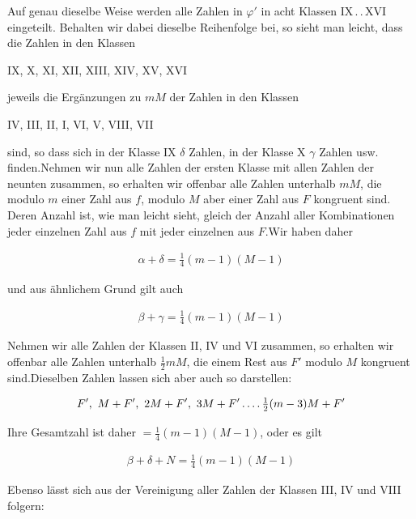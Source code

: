 Auf genau dieselbe Weise werden alle Zahlen in $\varphi'$ in acht Klassen IX\,.\,.\,XVI eingeteilt. Behalten wir dabei dieselbe Reihenfolge bei, so sieht man leicht, dass die Zahlen in den Klassen

\begin{center}IX, X, XI, XII, XIII, XIV, XV, XVI\end{center}

jeweils die Ergänzungen zu $mM$ der Zahlen in den Klassen

\begin{center}IV, III, II, I, VI, V, VIII, VII\end{center}

sind, so dass sich in der Klasse IX $\delta$ Zahlen, in der Klasse X $\gamma$ Zahlen usw. finden.\quad Nehmen wir nun alle Zahlen der ersten Klasse mit allen Zahlen der neunten zusammen, so erhalten wir offenbar alle Zahlen unterhalb $mM$, die modulo $m$ einer Zahl aus $f$, modulo $M$ aber einer Zahl aus $F$ kongruent sind. Deren Anzahl ist, wie man leicht sieht, gleich der Anzahl aller Kombinationen jeder einzelnen Zahl aus $f$ mit jeder einzelnen aus $F$.\quad Wir haben daher

\[
\begin{aligned}
\alpha+\delta=\tfrac14(m-1)(M-1)
\end{aligned}
\]

und aus ähnlichem Grund gilt auch

\[
\begin{aligned}
\beta+\gamma=\tfrac14(m-1)(M-1)
\end{aligned}
\]

Nehmen wir alle Zahlen der Klassen II, IV und VI zusammen, so erhalten wir offenbar alle Zahlen unterhalb $\frac12mM$, die einem Rest aus $F'$ modulo $M$ kongruent sind.\quad Dieselben Zahlen lassen sich aber auch so darstellen:

\[
\begin{aligned}
F',\ M+F',\ 2M+F',\ 3M+F'\mathinner{.\,.\,.\,.}\tfrac12(m-3)M+F'
\end{aligned}
\]

Ihre Gesamtzahl ist daher $=\frac14(m-1)(M-1)$, oder es gilt

\[
\begin{aligned}
\beta+\delta+N=\tfrac14(m-1)(M-1)
\end{aligned}
\]

Ebenso lässt sich aus der Vereinigung aller Zahlen der Klassen III, IV und VIII folgern:


